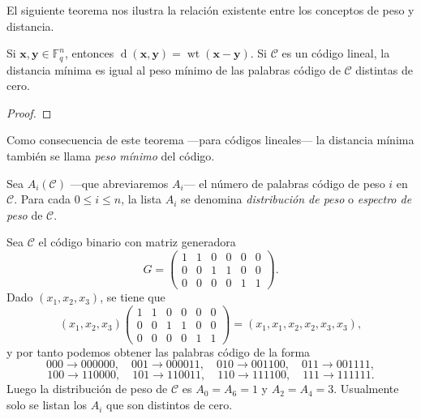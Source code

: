 El siguiente teorema nos ilustra la relación existente entre los conceptos de peso y distancia.

\begin{theorem}
  Si \(\mathbf{x}, \mathbf{y} \in \mathbb F_q^n\), entonces \(\operatorname{d}(\mathbf{x}, \mathbf{y}) = \operatorname{wt}(\mathbf{x} - \mathbf{y})\).
  Si \(\mathcal C\) es un código lineal, la distancia mínima es igual al peso mínimo de las palabras código de \(\mathcal C\) distintas de cero.
\end{theorem}

\begin{proof}
  
\end{proof}

Como consecuencia de este teorema —para códigos lineales— la distancia mínima también se llama \textit{peso mínimo} del código.

\begin{definition}
  Sea \(A_i(\mathcal C)\) —que abreviaremos \(A_i\)— el número de palabras código de peso \(i\) en \(\mathcal C\).
  Para cada \(0 \leq i \leq n\), la lista \(A_i\) se denomina \textit{distribución de peso} o \textit{espectro de peso} de \(\mathcal C\).
\end{definition}

\begin{example}
  Sea \(\mathcal C\) el código binario con matriz generadora
  \[
    G = \begin{pmatrix}
      1 & 1 & 0 & 0 & 0 & 0\\
      0 & 0 & 1 & 1 & 0 & 0 \\
      0 & 0 & 0 & 0 & 1 & 1
    \end{pmatrix}.
  \]
  Dado \((x_1, x_2, x_3)\), se tiene que \[(x_1, x_2, x_3) \begin{pmatrix}
    1 & 1 & 0 & 0 & 0 & 0\\
      0 & 0 & 1 & 1 & 0 & 0 \\
      0 & 0 & 0 & 0 & 1 & 1
  \end{pmatrix} = (x_1, x_1, x_2, x_2, x_3, x_3),\] y por tanto podemos obtener las palabras código de la forma 
  \[
    000 \to 000000, \!\quad 
    001 \to 000011,\!\quad 
    010 \to 001100,\!\quad 
    011 \to 001111,
  \]
  \[
    100 \to 110000, \!\quad 
    101 \to 110011,\!\quad 
    110 \to 111100,\!\quad 
    111 \to 111111.
  \]
  Luego la distribución de peso de \(\mathcal C\) es \(A_0 = A_6 = 1\) y \(A_2 = A_4 = 3\).
  Usualmente solo se listan los \(A_i\) que son distintos de cero.
\end{example}

